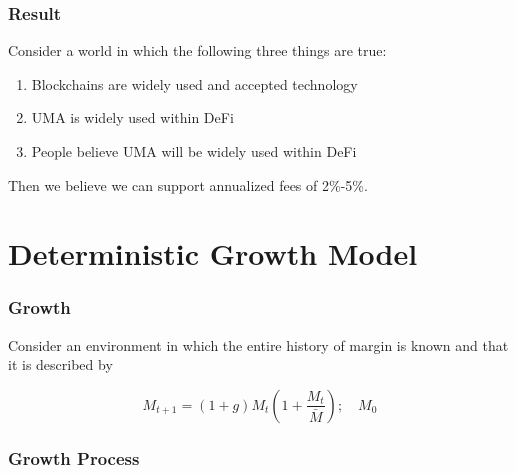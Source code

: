 \documentclass[10pt]{beamer}
\begin{document}
  \begin{frame} \frametitle{Result}

    Consider a world in which the following three things are true:

    \begin{enumerate}
      \item Blockchains are widely used and accepted technology
      \item UMA is widely used within DeFi
      \item People believe UMA will be widely used within DeFi
    \end{enumerate}

    Then we believe we can support annualized fees of 2\%-5\%.

  \end{frame}


\section{Deterministic Growth Model}

  \begin{frame} \frametitle{Growth}

    Consider an environment in which the entire history of margin is known and that it is described
    by

    $$M_{t+1} = (1 + g) M_t \left( 1 + \frac{M_t}{\bar{M}} \right) ;\quad M_0$$

  \end{frame}

  \begin{frame} \frametitle{Growth Process}

    \begin{figure}
      \label{fig:dg_tax_growth}
    \end{figure}

  \end{frame}
\end{document}
